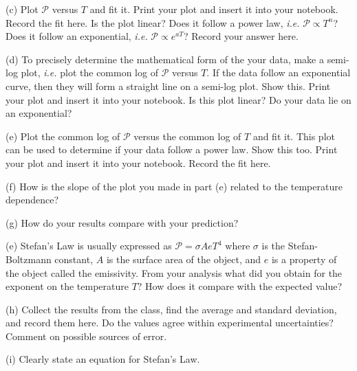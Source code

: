 \newpage

(c) Plot $\mathscr{P}$ versus $T$ and fit it. Print your plot and insert it into your notebook.
Record the fit here. Is the plot linear?
Does it follow a power law, {\it i.e.} $\mathscr{P} \propto T^n$?
Does it follow an exponential, {\it i.e.} $\mathscr{P} \propto e^{aT}$?
Record your answer here.
\vspace{1.0cm}

(d) To precisely  determine the mathematical form of the your data, make a semi-log plot, {\it i.e.} plot the common
log of $\mathscr{P}$ versus $T$.  If the data follow an exponential curve, then
they will form a straight line on a semi-log plot.
Show this.
Print your plot and insert it into your notebook.
Is this plot linear?
Do your data lie on an exponential?
\vspace{2.5cm}

(e) Plot the common log of $\mathscr{P}$ versus the common log of $T$ and fit it. 
This plot can be used to determine if your data follow a power law.
Show this too.
Print your plot and insert it into your notebook.
Record the fit here.
\vspace{2.5cm}

(f) How is the slope of the plot you made in part (e) related to the temperature dependence?
\vspace{1.0cm}

(g) How do your results compare with your prediction?
\vspace{1.5cm}

(e) Stefan's Law is usually expressed as $\mathscr{P} = \sigma Ae T^4$ where $\sigma$ is the 
Stefan-Boltzmann constant, $A$ is the surface area of the object, and $e$ is a property of the object 
called the emissivity. 
From your analysis what did you obtain for the exponent on the temperature $T$?
How does it compare with the expected value?
\vspace{1.5cm}

(h) Collect the results from the class, find the average and standard deviation, and record them here.
Do the values agree within experimental uncertainties?
Comment on possible sources of error.
\vspace{1.5cm}

(i) Clearly state an equation for Stefan's Law.

